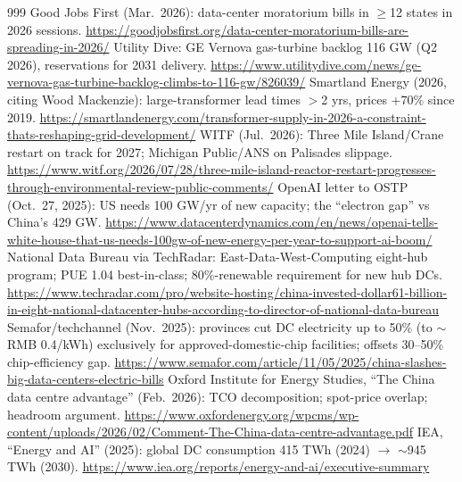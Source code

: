 \begin{thebibliography}{999}
 Good Jobs First (Mar.\ 2026): data-center moratorium bills in $\geq$12 states in 2026 sessions. \url{https://goodjobsfirst.org/data-center-moratorium-bills-are-spreading-in-2026/}
 Utility Dive: GE Vernova gas-turbine backlog 116 GW (Q2 2026), reservations for 2031 delivery. \url{https://www.utilitydive.com/news/ge-vernova-gas-turbine-backlog-climbs-to-116-gw/826039/}
 Smartland Energy (2026, citing Wood Mackenzie): large-transformer lead times $>$2 yrs, prices +70\% since 2019. \url{https://smartlandenergy.com/transformer-supply-in-2026-a-constraint-thats-reshaping-grid-development/}
 WITF (Jul.\ 2026): Three Mile Island/Crane restart on track for 2027; Michigan Public/ANS on Palisades slippage. \url{https://www.witf.org/2026/07/28/three-mile-island-reactor-restart-progresses-through-environmental-review-public-comments/}
 OpenAI letter to OSTP (Oct.\ 27, 2025): US needs 100 GW/yr of new capacity; the ``electron gap'' vs China's 429 GW. \url{https://www.datacenterdynamics.com/en/news/openai-tells-white-house-that-us-needs-100gw-of-new-energy-per-year-to-support-ai-boom/}
 National Data Bureau via TechRadar: East-Data-West-Computing eight-hub program; PUE 1.04 best-in-class; 80\%-renewable requirement for new hub DCs. \url{https://www.techradar.com/pro/website-hosting/china-invested-dollar61-billion-in-eight-national-datacenter-hubs-according-to-director-of-national-data-bureau}
 Semafor/techchannel (Nov.\ 2025): provinces cut DC electricity up to 50\% (to $\sim$RMB 0.4/kWh) exclusively for approved-domestic-chip facilities; offsets 30--50\% chip-efficiency gap. \url{https://www.semafor.com/article/11/05/2025/china-slashes-big-data-centers-electric-bills}
 Oxford Institute for Energy Studies, ``The China data centre advantage'' (Feb.\ 2026): TCO decomposition; spot-price overlap; headroom argument. \url{https://www.oxfordenergy.org/wpcms/wp-content/uploads/2026/02/Comment-The-China-data-centre-advantage.pdf}
 IEA, ``Energy and AI'' (2025): global DC consumption 415 TWh (2024) $\rightarrow$ $\sim$945 TWh (2030). \url{https://www.iea.org/reports/energy-and-ai/executive-summary}


\end{thebibliography}
